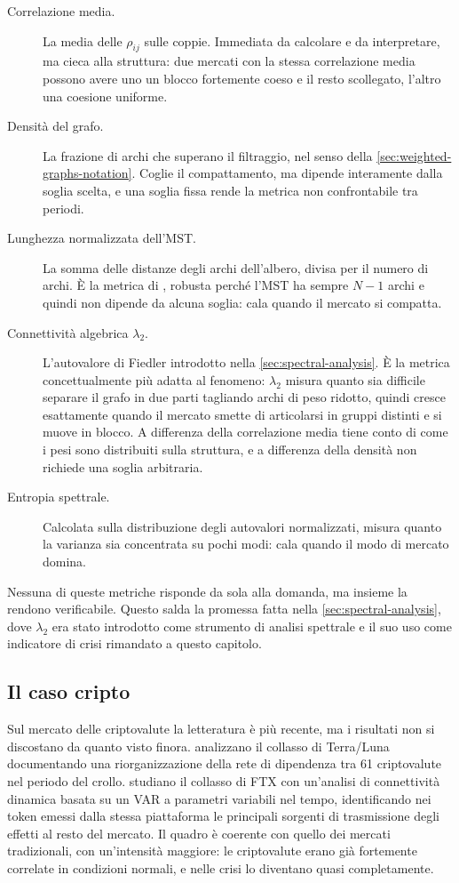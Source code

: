 \begin{description}
    \item[Correlazione media.] La media delle $\rho_{ij}$ sulle coppie. Immediata da calcolare e da interpretare, ma cieca alla struttura: due mercati con la stessa correlazione media possono avere uno un blocco fortemente coeso e il resto scollegato, l'altro una coesione uniforme.
    \item[Densità del grafo.] La frazione di archi che superano il filtraggio, nel senso della \cref{sec:weighted-graphs-notation}. Coglie il compattamento, ma dipende interamente dalla soglia scelta, e una soglia fissa rende la metrica non confrontabile tra periodi.
    \item[Lunghezza normalizzata dell'MST.] La somma delle distanze degli archi dell'albero, divisa per il numero di archi. È la metrica di \textcite{onnela2003dynamics}, robusta perché l'MST ha sempre $N-1$ archi e quindi non dipende da alcuna soglia: cala quando il mercato si compatta.
    \item[Connettività algebrica $\lambda_2$.] L'autovalore di Fiedler introdotto nella \cref{sec:spectral-analysis}. È la metrica concettualmente più adatta al fenomeno: $\lambda_2$ misura quanto sia difficile separare il grafo in due parti tagliando archi di peso ridotto, quindi cresce esattamente quando il mercato smette di articolarsi in gruppi distinti e si muove in blocco. A differenza della correlazione media tiene conto di come i pesi sono distribuiti sulla struttura, e a differenza della densità non richiede una soglia arbitraria.
    \item[Entropia spettrale.] Calcolata sulla distribuzione degli autovalori normalizzati, misura quanto la varianza sia concentrata su pochi modi: cala quando il modo di mercato domina.
\end{description}

Nessuna di queste metriche risponde da sola alla domanda, ma insieme la rendono verificabile. Questo salda la promessa fatta nella \cref{sec:spectral-analysis}, dove $\lambda_2$ era stato introdotto come strumento di analisi spettrale e il suo uso come indicatore di crisi rimandato a questo capitolo.

\subsection{Il caso cripto}

Sul mercato delle criptovalute la letteratura è più recente, ma i risultati non si discostano da quanto visto finora. \Textcite{briola2023anatomy} analizzano il collasso di Terra/Luna documentando una riorganizzazione della rete di dipendenza tra 61 criptovalute nel periodo del crollo. \Textcite{akyildirim2023understanding} studiano il collasso di FTX con un'analisi di connettività dinamica basata su un VAR a parametri variabili nel tempo, identificando nei token emessi dalla stessa piattaforma le principali sorgenti di trasmissione degli effetti al resto del mercato. Il quadro è coerente con quello dei mercati tradizionali, con un'intensità maggiore: le criptovalute erano già fortemente correlate in condizioni normali, e nelle crisi lo diventano quasi completamente.

